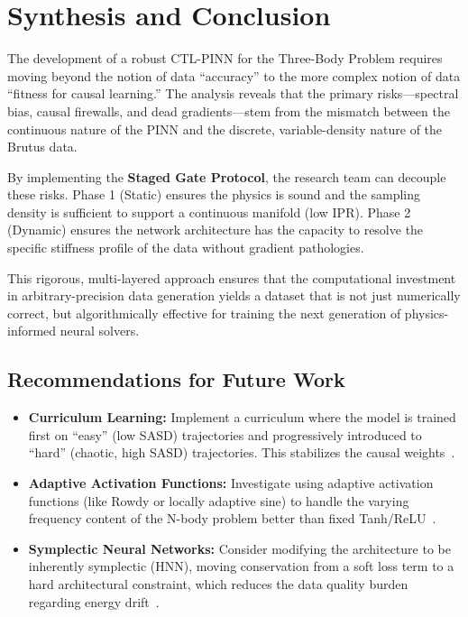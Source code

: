 \section{Synthesis and Conclusion}

The development of a robust CTL-PINN for the Three-Body Problem requires moving beyond the notion of data ``accuracy'' to the more complex notion of data ``fitness for causal learning.'' The analysis reveals that the primary risks—spectral bias, causal firewalls, and dead gradients—stem from the mismatch between the continuous nature of the PINN and the discrete, variable-density nature of the Brutus data.

By implementing the \textbf{Staged Gate Protocol}, the research team can decouple these risks. Phase 1 (Static) ensures the physics is sound and the sampling density is sufficient to support a continuous manifold (low IPR). Phase 2 (Dynamic) ensures the network architecture has the capacity to resolve the specific stiffness profile of the data without gradient pathologies.

This rigorous, multi-layered approach ensures that the computational investment in arbitrary-precision data generation yields a dataset that is not just numerically correct, but algorithmically effective for training the next generation of physics-informed neural solvers.

\subsection{Recommendations for Future Work}

\begin{itemize}
    \item \textbf{Curriculum Learning:} Implement a curriculum where the model is trained first on ``easy'' (low SASD) trajectories and progressively introduced to ``hard'' (chaotic, high SASD) trajectories. This stabilizes the causal weights~\cite{ref10}.
    \item \textbf{Adaptive Activation Functions:} Investigate using adaptive activation functions (like Rowdy or locally adaptive sine) to handle the varying frequency content of the N-body problem better than fixed Tanh/ReLU~\cite{ref8}.
    \item \textbf{Symplectic Neural Networks:} Consider modifying the architecture to be inherently symplectic (HNN), moving conservation from a soft loss term to a hard architectural constraint, which reduces the data quality burden regarding energy drift~\cite{ref33}.
\end{itemize}